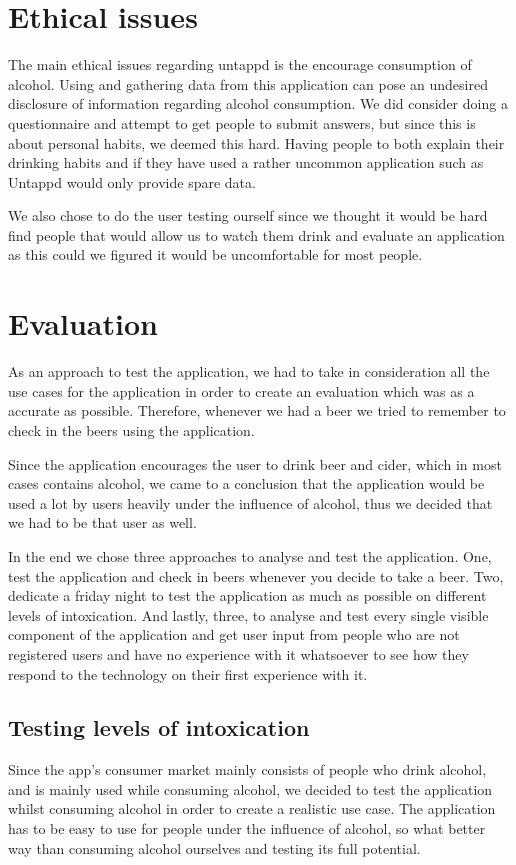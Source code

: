 \documentclass[12pt]{article}
\begin{document}
\section{Ethical issues}
The main ethical issues regarding untappd is the encourage consumption of
alcohol. Using and gathering data from this application can pose an undesired disclosure
of information regarding alcohol consumption. We did consider doing a
questionnaire and attempt to get people to submit answers, but since this is
about personal habits, we deemed this hard. Having people to both explain their
drinking habits and if they have used a rather uncommon application such as Untappd
would only provide spare data.


We also chose to do the user testing ourself since we thought it would be hard
find people that would allow us to watch them drink and evaluate an application as this
could we figured it would be uncomfortable for most people.


\section{Evaluation}
As an approach to test the application, we had to take in consideration all the
use cases for the application in order to create an evaluation which was as a
accurate as possible. Therefore, whenever we had a beer we tried to remember to
check in the beers using the application.


Since the application encourages the user to drink beer and cider, which in most
cases contains alcohol, we came to a conclusion that the application would be
used a lot by users heavily under the influence of alcohol, thus we decided that
we had to be that user as well. 


In the end we chose three approaches to analyse and test the application. One,
test the application and check in beers whenever you decide to take a beer. Two,
dedicate a friday night to test the application as much as possible on different
levels of intoxication. And lastly, three, to analyse and test every single
visible component of the application and get user input from people who are not
registered users and have no experience with it whatsoever to see how they
respond to the technology on their first experience with it.




\subsection{Testing levels of intoxication}
Since the app’s consumer market mainly consists of people who drink alcohol, and
is mainly used while consuming alcohol, we decided to test the application
whilst consuming alcohol in order to create a realistic use case. The
application has to be easy to use for people under the influence of alcohol, so
what better way than consuming alcohol ourselves and testing its full potential. 
\end{document}
